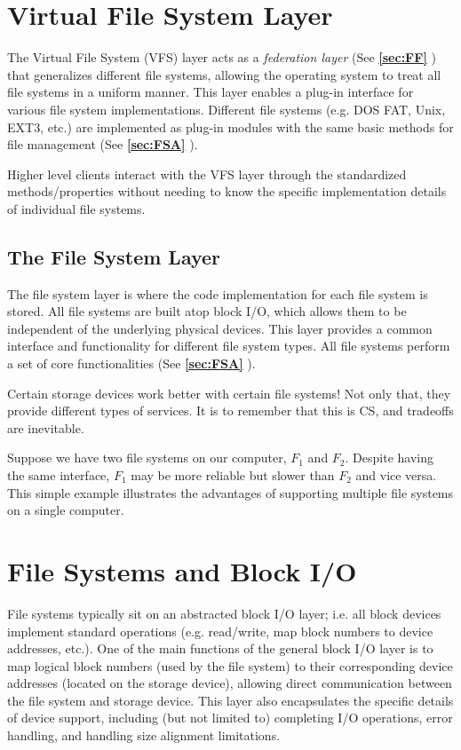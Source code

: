 \documentclass{report}
\newcommand{\exampleBegin}[1]{\begin{tcolorbox}[colback=blue!5!white,colframe=black!75!blue,title={Example:
      #1}]}
\newcommand{\exampleEnd}{\end{tcolorbox}}
\newcommand{\asideBegin}[1]{\begin{tcolorbox}[colback=orange!5!white,colframe=black!75!orange,title={Aside:
      #1}]}
\newcommand{\asideEnd}{\end{tcolorbox}}
\newcommand{\refto}[2]{\textbf{\ref{#1:#2} \nameref{#1:#2}}}
\begin{document}
\section{Virtual File System Layer}
The Virtual File System (VFS) layer acts as a \textit{federation layer} (See \refto{sec}{FF}) that
generalizes different file systems, allowing the operating system to treat all file systems in a
uniform manner. This layer enables a plug-in interface for various file system
implementations. Different file systems (e.g. DOS FAT, Unix, EXT3, etc.) are implemented as plug-in
modules with the same basic methods for file management (See \refto{sec}{FSA}).

Higher level clients interact with the VFS layer through the standardized methods/properties without
needing to know the specific implementation details of individual file systems.


\subsection{The File System Layer}
The file system layer is where the code implementation for each file system is stored. All file
systems are built atop block I/O, which allows them to be independent of the underlying physical
devices. This layer provides a common interface and functionality for different file system
types. All file systems perform a set of core functionalities (See \refto{sec}{FSA}).

\asideBegin{Why Multiple File Systems?}
Certain storage devices work better with certain file systems! Not only that, they provide different
types of services. It is to remember that this is CS, and tradeoffs are inevitable.

\exampleBegin{New File System New Services}
Suppose we have two file systems on our computer, $F_1$ and $F_2$. Despite having the same
interface, $F_1$ may be more reliable but slower than $F_2$ and vice versa. This simple example
illustrates the advantages of supporting multiple file systems on a single computer.
\exampleEnd
\asideEnd


\section{File Systems and Block I/O}
File systems typically sit on an abstracted block I/O layer; i.e. all block devices implement
standard operations (e.g. read/write, map block numbers to device addresses, etc.). One of the main
functions of the general block I/O layer is to map logical block numbers (used by the file system)
to their corresponding device addresses (located on the storage device), allowing direct
communication between the file system and storage device. This layer also encapsulates the specific
details of device support, including (but not limited to) completing I/O operations, error handling,
and handling size alignment limitations.
\end{document}
